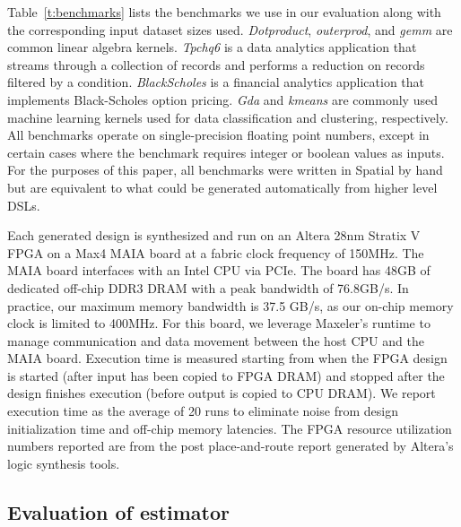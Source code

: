 Table~\ref{t:benchmarks} lists the benchmarks we use in our evaluation along with the corresponding
input dataset sizes used. \emph{Dotproduct}, \emph{outerprod}, and \emph{gemm} are common
linear algebra kernels. \emph{Tpchq6} is a data analytics application that streams through a collection
of records and performs a reduction on records filtered by a condition. \emph{BlackScholes} is
a financial analytics application that implements Black-Scholes option pricing. \emph{Gda}
and \emph{kmeans}
are commonly used machine learning kernels used for data classification and clustering, respectively.
All benchmarks operate on single-precision floating point numbers,
except in certain cases where the benchmark requires integer or boolean values as inputs.
For the purposes of this paper, all benchmarks were written in Spatial by hand but are equivalent to what
could be generated automatically from higher level DSLs.

Each generated design is synthesized and run on an Altera 28nm Stratix V FPGA
on a Max4 MAIA board at a fabric clock frequency of 150MHz. The MAIA board interfaces with an Intel CPU
via PCIe. The board has 48GB of dedicated off-chip DDR3 DRAM with a peak bandwidth of 76.8GB/s. In practice,
our maximum memory bandwidth is 37.5 GB/s, as our on-chip memory clock is limited to 400MHz.
For this board, we leverage Maxeler's runtime to manage communication and data movement
between the host CPU and the MAIA board.
Execution time is measured starting
from when the FPGA design is started (after input has been copied to FPGA DRAM) and stopped after
the design finishes execution (before output is copied to CPU DRAM). We report execution time as the
average of 20 runs to eliminate noise from design initialization time and off-chip memory latencies.
The FPGA resource utilization
numbers reported are from the post place-and-route report generated by Altera's logic synthesis tools.

\subsection{Evaluation of estimator}

